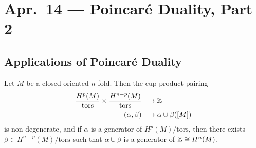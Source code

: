 \chapter{Apr.~14 --- Poincar\'e Duality, Part 2}

\section{Applications of Poincar\'e Duality}

\begin{corollary}\label{cor:cup-product-pairing}
  Let $M$ be a closed oriented $n$-fold.
  Then the cup product pairing
  \begin{align*}
    \frac{H^p(M)}{\mathrm{tors}}
    \times \frac{H^{n - p}(M)}{\mathrm{tors}}
    &\longrightarrow \mathbb{Z} \\
    (\alpha, \beta)
    &\longmapsto \alpha \cup \beta([M])
  \end{align*}
  is non-degenerate, and if $\alpha$ is a
  generator of  $H^p(M) / \mathrm{tors}$, then there
  exists $\beta \in H^{n - p}(M) / \mathrm{tors}$ such that
  $\alpha \cup \beta$ is a generator of
  $\mathbb{Z} \cong H^n(M)$.
\end{corollary}

